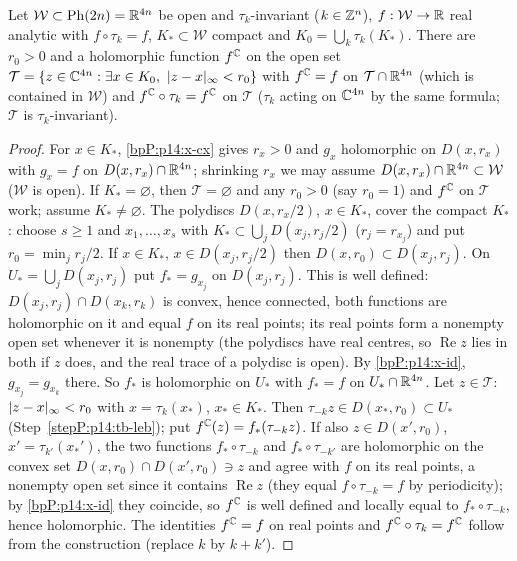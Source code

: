 \begin{lemma}\label{bpP:p14:tube}
Let $\mathcal W\subset\mathrm{Ph}(2n)=\mathbb{R}^{4n}$ be open and $\tau_k$-invariant ($k\in\mathbb{Z}^n$), $f:\mathcal W\to\mathbb{R}$ real analytic with $f\circ\tau_k=f$, $K_*\subset\mathcal W$ compact and $K_0=\bigcup_k\tau_k(K_*)$. There are $r_0>0$ and a holomorphic function $f^{\mathbb{C}}$ on the open set $\mathcal T=\{z\in\mathbb{C}^{4n}:\exists x\in K_0,\ \lvert z-x\rvert_\infty<r_0\}$ with $f^{\mathbb{C}}=f$ on $\mathcal T\cap\mathbb{R}^{4n}$ (which is contained in $\mathcal W$) and $f^{\mathbb{C}}\circ\tau_k=f^{\mathbb{C}}$ on $\mathcal T$ ($\tau_k$ acting on $\mathbb{C}^{4n}$ by the same formula; $\mathcal T$ is $\tau_k$-invariant).
\end{lemma}
\begin{proof}
\label{stepP:p14:tb-local} For $x\in K_*$, \ref{bpP:p14:x-cx} gives $r_x>0$ and $g_x$ holomorphic on $D(x,r_x)$ with $g_x=f$ on $D(x,r_x)\cap\mathbb{R}^{4n}$; shrinking $r_x$ we may assume $D(x,r_x)\cap\mathbb{R}^{4n}\subset\mathcal W$ ($\mathcal W$ is open).
\label{stepP:p14:tb-leb} If $K_*=\varnothing$, then $\mathcal T=\varnothing$ and any $r_0>0$ (say $r_0=1$) and $f^{\mathbb{C}}$ on $\mathcal T$ work; assume $K_*\ne\varnothing$. The polydiscs $D(x,r_x/2)$, $x\in K_*$, cover the compact $K_*$: choose $s\ge1$ and $x_1,\dots,x_s$ with $K_*\subset\bigcup_jD(x_j,r_j/2)$ ($r_j=r_{x_j}$) and put $r_0=\min_jr_j/2$. If $x\in K_*$, $x\in D(x_j,r_j/2)$ then $D(x,r_0)\subset D(x_j,r_j)$.
\label{stepP:p14:tb-glue} On $U_*=\bigcup_jD(x_j,r_j)$ put $f_*=g_{x_j}$ on $D(x_j,r_j)$. This is well defined: $D(x_j,r_j)\cap D(x_k,r_k)$ is convex, hence connected, both functions are holomorphic on it and equal $f$ on its real points; its real points form a nonempty open set whenever it is nonempty (the polydiscs have real centres, so $\operatorname{Re}z$ lies in both if $z$ does, and the real trace of a polydisc is open). By \ref{bpP:p14:x-id}, $g_{x_j}=g_{x_k}$ there. So $f_*$ is holomorphic on $U_*$ with $f_*=f$ on $U_*\cap\mathbb{R}^{4n}$.
\label{stepP:p14:tb-per} Let $z\in\mathcal T$: $\lvert z-x\rvert_\infty<r_0$ with $x=\tau_k(x_*)$, $x_*\in K_*$. Then $\tau_{-k}z\in D(x_*,r_0)\subset U_*$ (Step~\ref{stepP:p14:tb-leb}); put $f^{\mathbb{C}}(z)=f_*(\tau_{-k}z)$. If also $z\in D(x',r_0)$, $x'=\tau_{k'}(x_*')$, the two functions $f_*\circ\tau_{-k}$ and $f_*\circ\tau_{-k'}$ are holomorphic on the convex set $D(x,r_0)\cap D(x',r_0)\ni z$ and agree with $f$ on its real points, a nonempty open set since it contains $\operatorname{Re}z$ (they equal $f\circ\tau_{-k}=f$ by periodicity); by \ref{bpP:p14:x-id} they coincide, so $f^{\mathbb{C}}$ is well defined and locally equal to $f_*\circ\tau_{-k}$, hence holomorphic. The identities $f^{\mathbb{C}}=f$ on real points and $f^{\mathbb{C}}\circ\tau_k=f^{\mathbb{C}}$ follow from the construction (replace $k$ by $k+k'$).
\end{proof}


